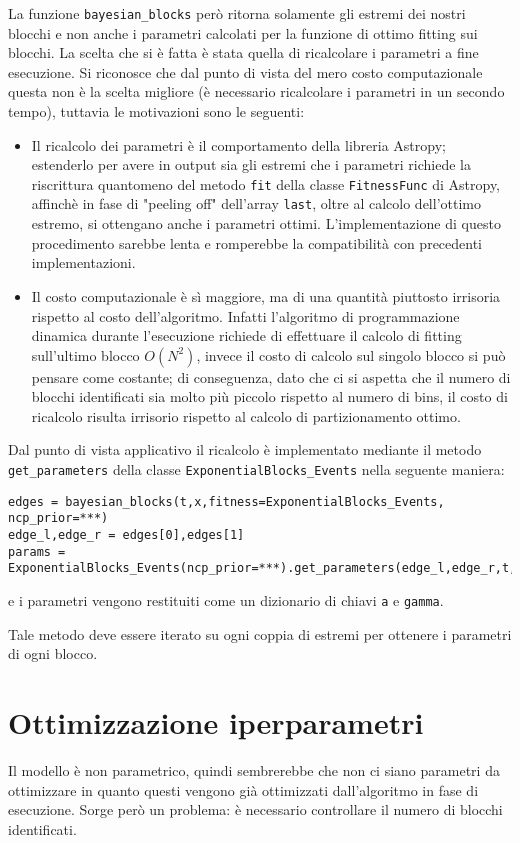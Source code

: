 \documentclass[10pt,a4paper]{report}
\begin{document}
La funzione \texttt{bayesian\_blocks} però ritorna solamente gli estremi dei nostri blocchi e non anche i parametri calcolati per la funzione di ottimo fitting sui blocchi.
La scelta che si è fatta è stata quella di ricalcolare i parametri a fine esecuzione. Si riconosce che dal punto di vista del mero costo computazionale questa non è la scelta migliore (è necessario ricalcolare i parametri in un secondo tempo), tuttavia le motivazioni sono le seguenti:
\begin{itemize}
\item Il ricalcolo dei parametri è il comportamento della libreria Astropy; estenderlo per avere in output sia gli estremi che i parametri richiede la riscrittura quantomeno del metodo \texttt{fit} della classe \texttt{FitnessFunc} di Astropy, affinchè in fase di "peeling off" dell'array \texttt{last}, oltre al calcolo dell'ottimo estremo, si ottengano anche i parametri ottimi. L'implementazione di questo procedimento sarebbe lenta e romperebbe la compatibilità con precedenti implementazioni.
\item Il costo computazionale è sì maggiore, ma di una quantità piuttosto irrisoria rispetto al costo dell'algoritmo. Infatti l'algoritmo di programmazione dinamica durante l'esecuzione richiede di effettuare il calcolo di fitting sull'ultimo blocco $O(N^2)$, invece il costo di calcolo sul singolo blocco si può pensare come costante; di conseguenza, dato che ci si aspetta che il numero di blocchi identificati sia molto più piccolo rispetto al numero di bins, il costo di ricalcolo risulta irrisorio rispetto al calcolo di partizionamento ottimo.
\end{itemize}
Dal punto di vista applicativo il ricalcolo è implementato mediante il metodo \texttt{get\_parameters} della classe \texttt{ExponentialBlocks\_Events} nella seguente maniera:
\begin{verbatim}
edges = bayesian_blocks(t,x,fitness=ExponentialBlocks_Events, ncp_prior=***)
edge_l,edge_r = edges[0],edges[1]
params = ExponentialBlocks_Events(ncp_prior=***).get_parameters(edge_l,edge_r,t,x)
\end{verbatim}
e i parametri vengono restituiti come un dizionario di chiavi \texttt{a} e \texttt{gamma}.

Tale metodo deve essere iterato su ogni coppia di estremi per ottenere i parametri di ogni blocco.
\section{Ottimizzazione iperparametri}
Il modello è non parametrico, quindi sembrerebbe che non ci siano parametri da ottimizzare in quanto questi vengono già ottimizzati dall'algoritmo in fase di esecuzione. Sorge però un problema: è necessario controllare il numero di blocchi identificati.
\end{document}
